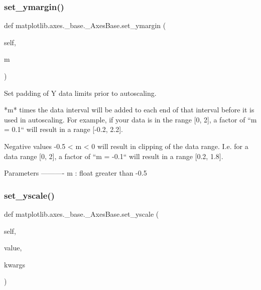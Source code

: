 \subsubsection{\texorpdfstring{set\+\_\+ymargin()}{set\_ymargin()}}
{\footnotesize\ttfamily def matplotlib.\+axes.\+\_\+base.\+\_\+\+Axes\+Base.\+set\+\_\+ymargin (\begin{DoxyParamCaption}\item[{}]{self,  }\item[{}]{m }\end{DoxyParamCaption})}

\begin{DoxyVerb}Set padding of Y data limits prior to autoscaling.

*m* times the data interval will be added to each
end of that interval before it is used in autoscaling.
For example, if your data is in the range [0, 2], a factor of
``m = 0.1`` will result in a range [-0.2, 2.2].

Negative values -0.5 < m < 0 will result in clipping of the data range.
I.e. for a data range [0, 2], a factor of ``m = -0.1`` will result in
a range [0.2, 1.8].

Parameters
----------
m : float greater than -0.5
\end{DoxyVerb}
 \mbox{\label{classmatplotlib_1_1axes_1_1__base_1_1__AxesBase_a708856db59b121acde2d36e1d25cad03}} 
\subsubsection{\texorpdfstring{set\+\_\+yscale()}{set\_yscale()}}
{\footnotesize\ttfamily def matplotlib.\+axes.\+\_\+base.\+\_\+\+Axes\+Base.\+set\+\_\+yscale (\begin{DoxyParamCaption}\item[{}]{self,  }\item[{}]{value,  }\item[{}]{kwargs }\end{DoxyParamCaption})}

